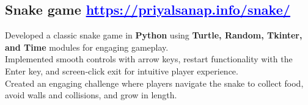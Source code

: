 \documentclass[]{resume}
\begin{document}
\subsection{Snake game \small \href{https://priyalsanap.info/snake/}{\textcolor{blue}{\underline{https://priyalsanap.info/snake/}}}\hfill }

\begin{adjustwidth}{0.5cm}{0cm}
    \pt Developed a classic snake game in \textbf{Python} using \textbf{Turtle, Random, Tkinter, and Time} modules for engaging gameplay. \\
    \pt Implemented smooth controls with arrow keys, restart functionality with the Enter key, and screen-click exit for intuitive player experience. \\
    \pt Created an engaging challenge where players navigate the snake to collect food, avoid walls and collisions, and grow in length. \\
    \sectionsep
\end{adjustwidth}









\end{document}
